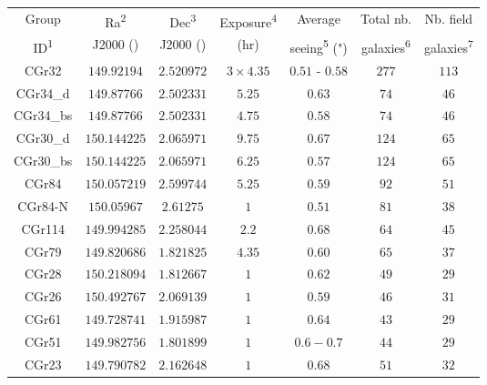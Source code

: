 \begin{table}[htbp]

	\centering
	\hspace{50pt}

	\begin{tabular}{ccccccc}
	\hline
	Group & Ra\textsuperscript{2} & Dec\textsuperscript{3} & Exposure\textsuperscript{4}  & Average & Total nb. & Nb. field \\
	
	ID\textsuperscript{1} & J2000 (\degree) & J2000 (\degree) & (hr) & seeing\textsuperscript{5} (") & galaxies\textsuperscript{6} & galaxies\textsuperscript{7} \\	
	
	
	\hline
	CGr32 & $149.92194$ & $2.520972$ & $3 \times 4.35$ & $0.51$ - $0.58$ & $277$ & $113$ \\
	\hline
	CGr34\_d & $149.87766$ & $2.502331$ & $5.25$ & $0.63$ & $74$ & $46$ \\
	\hline
	CGr34\_bs & $149.87766$ & $2.502331$ & $4.75$ & $0.58$ & $74$ & $46$ \\
	\hline
	CGr30\_d & $150.144225$ & $2.065971$ & $9.75$ & $0.67$ & $124$ & $65$ \\
	\hline
	CGr30\_bs & $150.144225$ & $2.065971$ & $6.25$ & $0.57$ & $124$ & $65$ \\
	\hline
	CGr84 & $150.057219$ & $2.599744$ & $5.25$ & $0.59$ & $92$ & $51$ \\
	\hline
	CGr84-N & $150.05967$ & $2.61275$ & $1$ & $0.51$ & $81$ & $38$ \\
	\hline
	CGr114 & $149.994285$ & $2.258044$ & $2.2$ & $0.68$ & $64$ & $45$ \\
	\hline
	CGr79 & $149.820686$ & $1.821825$ & $4.35$ & $0.60$ & $65$ & $37$ \\
	\hline
	CGr28 & $150.218094$ & $1.812667$ & $1$ & $0.62$ & $49$ & $29$ \\
	\hline
	CGr26 & $150.492767$ & $2.069139$ & $1$ & $0.59$ & $46$ & $31$ \\
	\hline
	CGr61 & $149.728741$ & $1.915987$ & $1$ & $0.64$ & $43$ & $29$ \\
	\hline
	CGr51 & $149.982756$ & $1.801899$ & $1$ & $0.6-0.7$ & $44$ & $29$ \\
	\hline
	CGr23 & $149.790782$ & $2.162648$ & $1$ & $0.68$ & $51$ & $32$ \\
	\hline
	
	\end{tabular}
	

\end{table}
